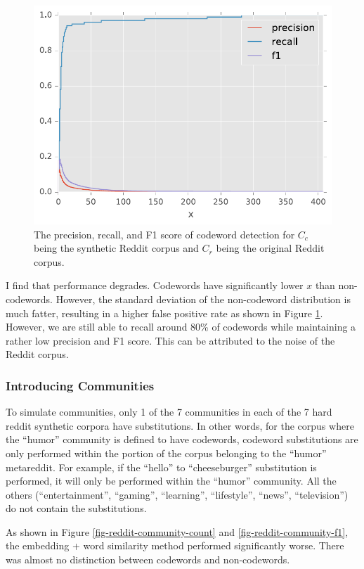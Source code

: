 \begin{figure}[h]
\centering
\includegraphics[width=.5\textwidth]{figures/reddit-f1.pdf}
\caption{The precision, recall, and F1 score of codeword detection for $C_c$ being the synthetic Reddit corpus and $C_r$ being the original Reddit corpus.}
\label{fig-reddit-f1}
\end{figure}

I find that performance degrades. Codewords have significantly lower $x$ than non-codewords. However, the standard deviation of the non-codeword distribution is much fatter, resulting in a higher false positive rate as shown in Figure \ref{fig-reddit-f1}. However, we are still able to recall around 80\% of codewords while maintaining a rather low precision and F1 score. This can be attributed to the noise of the Reddit corpus.

\subsubsection{Introducing Communities}

To simulate communities, only 1 of the 7 communities in each of the 7 hard reddit synthetic corpora have substitutions. In other words, for the corpus where the ``humor'' community is defined to have codewords, codeword substitutions are only performed within the portion of the corpus belonging to the ``humor'' metareddit. For example, if the ``hello'' to ``cheeseburger'' substitution is performed, it will only be performed within the ``humor'' community. All the others (``entertainment'', ``gaming'', ``learning'', ``lifestyle'', ``news'', ``television'') do not contain the substitutions.

As shown in Figure \ref{fig-reddit-community-count} and \ref{fig-reddit-community-f1}, the embedding + word similarity method performed significantly worse. There was almost no distinction between codewords and non-codewords.

